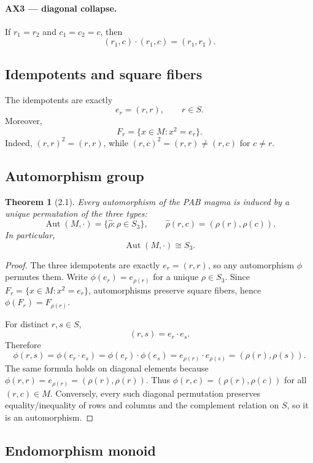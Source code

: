 \documentclass[11pt]{article}
\newtheorem*{theoremstar}{Theorem}
\begin{document}
\paragraph{AX3 --- diagonal collapse.} If \(r_1=r_2\) and \(c_1=c_2=c\), then
\[
(r_1,c)\cdot(r_1,c)=(r_1,r_1).
\]

\subsection{Idempotents and square fibers}

The idempotents are exactly
\[
e_r=(r,r),\qquad r\in S.
\]
Moreover,
\[
F_r=\{x\in M:x^2=e_r\}.
\]
Indeed, \((r,r)^2=(r,r)\), while \((r,c)^2=(r,r)\ne(r,c)\) for \(c\ne r\).

\subsection{Automorphism group}

\begin{theoremstar}[2.1]
Every automorphism of the PAB magma is induced by a unique
permutation of the three types:
\[
\operatorname{Aut}(M,\cdot)=\{\widehat\rho:\rho\in S_3\},
\qquad
\widehat\rho(r,c)=(\rho(r),\rho(c)).
\]
In particular,
\[
\operatorname{Aut}(M,\cdot)\cong S_3.
\]

\end{theoremstar}
\begin{proof}
The three idempotents are exactly \(e_r=(r,r)\), so any automorphism
\(\phi\) permutes them. Write \(\phi(e_r)=e_{\rho(r)}\) for a unique
\(\rho\in S_3\). Since \(F_r=\{x\in M:x^2=e_r\}\), automorphisms preserve square
fibers, hence \(\phi(F_r)=F_{\rho(r)}\).

For distinct \(r,s\in S\),
\[
(r,s)=e_r\cdot e_s.
\]
Therefore
\[
\phi(r,s)=\phi(e_r\cdot e_s)=\phi(e_r)\cdot\phi(e_s)
=e_{\rho(r)}\cdot e_{\rho(s)}=(\rho(r),\rho(s)).
\]
The same formula holds on diagonal elements because
\(\phi(r,r)=e_{\rho(r)}=(\rho(r),\rho(r))\). Thus
\(\phi(r,c)=(\rho(r),\rho(c))\) for all \((r,c)\in M\). Conversely, every such
diagonal permutation preserves equality/inequality of rows and columns and the
complement relation on \(S\), so it is an automorphism.

\end{proof}
\subsection{Endomorphism monoid}
\end{document}
